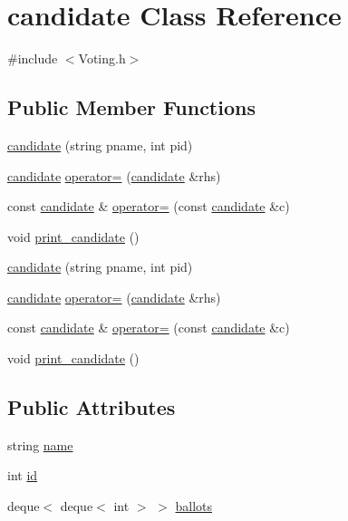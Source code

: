 \hypertarget{classcandidate}{\section{candidate Class Reference}
\label{classcandidate}
}


{\ttfamily \#include $<$Voting.\-h$>$}

\subsection*{Public Member Functions}
\begin{DoxyCompactItemize}
\item 
\hyperlink{classcandidate_acdc5859c6303e8b1eaa65d0154887c65}{candidate} (string pname, int pid)
\item 
\hyperlink{classcandidate}{candidate} \hyperlink{classcandidate_a1af1730b4f2e6a3b1947bbd1c5e5c094}{operator=} (\hyperlink{classcandidate}{candidate} \&rhs)
\item 
const \hyperlink{classcandidate}{candidate} \& \hyperlink{classcandidate_a436ceedf485a23d3c88edbac10fd8f65}{operator=} (const \hyperlink{classcandidate}{candidate} \&c)
\item 
void \hyperlink{classcandidate_a2e3fe36070679f88542cc1cbc4a1a1bd}{print\-\_\-candidate} ()
\item 
\hyperlink{classcandidate_acdc5859c6303e8b1eaa65d0154887c65}{candidate} (string pname, int pid)
\item 
\hyperlink{classcandidate}{candidate} \hyperlink{classcandidate_a1af1730b4f2e6a3b1947bbd1c5e5c094}{operator=} (\hyperlink{classcandidate}{candidate} \&rhs)
\item 
const \hyperlink{classcandidate}{candidate} \& \hyperlink{classcandidate_a436ceedf485a23d3c88edbac10fd8f65}{operator=} (const \hyperlink{classcandidate}{candidate} \&c)
\item 
void \hyperlink{classcandidate_a2e3fe36070679f88542cc1cbc4a1a1bd}{print\-\_\-candidate} ()
\end{DoxyCompactItemize}
\subsection*{Public Attributes}
\begin{DoxyCompactItemize}
\item 
string \hyperlink{classcandidate_a1f1b1e89d8b9eb46fb434fbda193f15d}{name}
\item 
int \hyperlink{classcandidate_aa4d4295af21c1e74fde9e103271e7cde}{id}
\item 
deque$<$ deque$<$ int $>$ $>$ \hyperlink{classcandidate_a925678448c6bcc5d3ba71569099afb00}{ballots}
\end{DoxyCompactItemize}


